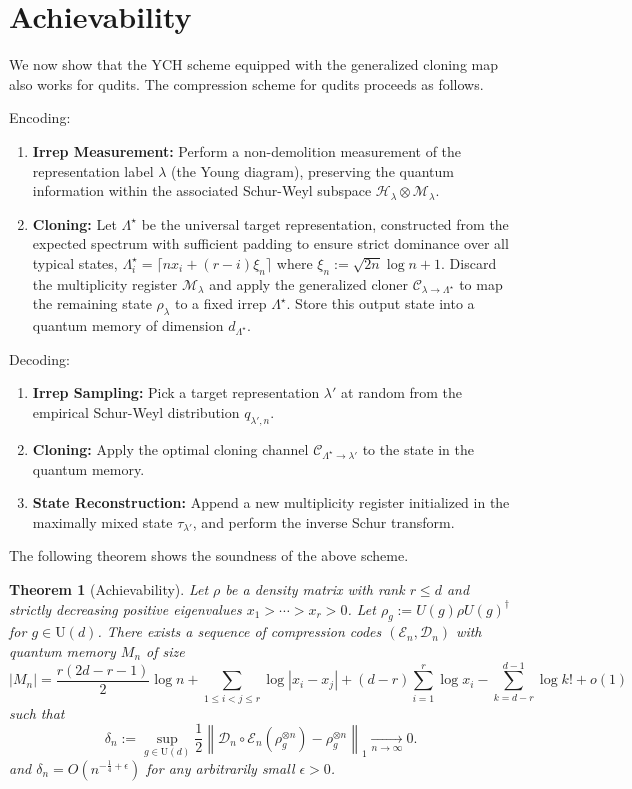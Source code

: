 \documentclass[a4paper,onecolumn,11pt]{quantumarticle}
\newtheorem{thm}{Theorem}
\begin{document}
\section{Achievability}\label{sec:direct}

We now show that the YCH scheme equipped with the generalized cloning map also works for qudits. 
The compression scheme for qudits proceeds as follows. 

Encoding:
\begin{enumerate}
    \item \textbf{Irrep Measurement:} Perform a non-demolition measurement of the representation label $\lambda$ (the Young diagram), preserving the quantum information within the associated Schur-Weyl subspace $\mathcal{H}_\lambda \otimes \mathcal{M}_\lambda$. 
    \item \textbf{Cloning:} Let $\Lambda^\star$ be the universal target representation, constructed from the expected spectrum with sufficient padding to ensure strict dominance over all typical states, $\Lambda^\star_i = \lceil n x_i + (r-i)\xi_n \rceil$ where $\xi_n:=\sqrt{2n}\log n+1$. Discard the multiplicity register $\mathcal{M}_\lambda$ and apply the generalized cloner $\mathcal{C}_{\lambda\to \Lambda^\star}$ to map the remaining state $\rho_\lambda$ to a fixed irrep $\Lambda^\star$. Store this output state into a quantum memory of dimension $d_{\Lambda^\star}$.
\end{enumerate}

Decoding:
\begin{enumerate}
    \item \textbf{Irrep Sampling:} Pick a target representation $\lambda'$ at random from the empirical Schur-Weyl distribution $q_{\lambda',n}$.
    \item \textbf{Cloning:} Apply the optimal cloning channel $\mathcal{C}_{\Lambda^\star\to \lambda'}$ to the state in the quantum memory.
    \item \textbf{State Reconstruction:} Append a new multiplicity register initialized in the maximally mixed state $\tau_{\lambda'}$, and perform the inverse Schur transform.
\end{enumerate}

The following theorem shows the soundness of the above scheme.
\begin{thm}[Achievability]\label{thm:achievability}
Let $\rho$ be a density matrix with rank $r\le d$ and strictly decreasing positive eigenvalues $x_1>\cdots>x_r>0$. Let $\rho_g:= U(g)\rho U(g)^\dagger$ for $g\in \mathrm U(d)$.
There exists a sequence of compression codes $(\mathcal E_n,\mathcal D_n)$ with quantum memory $M_n$ of size
\[
    |M_n| = \frac{r(2d-r-1)}{2}\log n + \sum_{1 \le i < j \le r}\log|x_i-x_j| + (d-r)\sum_{i=1}^r \log x_i - \sum_{k=d-r}^{d-1}\log k! + o(1)
\]
such that
\[
    \delta_n:= 
    \sup_{g\in \mathrm U(d)}
    \frac12\left\|
        \mathcal D_n\circ \mathcal E_n(\rho_g^{\otimes n}) - \rho_g^{\otimes n}
    \right\|_1
    \xrightarrow[n\to\infty]{}0 .
\]
and $\delta_n=O(n^{-\frac14+\epsilon})$ for any arbitrarily small $\epsilon>0$.
\end{thm}
\end{document}

